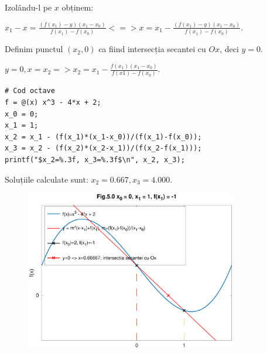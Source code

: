 \documentclass[12pt]{article}
\begin{document}
Izolându-l pe $x$ obținem:

$x_1-x = \frac{(f(x_1)-y)(x_1-x_0)}{f(x_1)-f(x_0)} <=>
x = x_1-\frac{(f(x_1)-y)(x_1-x_0)}{f(x_1)-f(x_0)}$.

Definim punctul $(x_2,0)$ ca fiind intersecția secantei cu $Ox$, deci $y=0$.

$y=0, x=x_2 => x_2 = x_1-\frac{f(x_1)(x_1-x_0)}{f(x1)-f(x_0)}$.

\scriptsize
\begin{verbatim}
# Cod octave
f = @(x) x^3 - 4*x + 2;
x_0 = 0;
x_1 = 1;
x_2 = x_1 - (f(x_1)*(x_1-x_0))/(f(x_1)-f(x_0));
x_3 = x_2 - (f(x_2)*(x_2-x_1))/(f(x_2-f(x_1)));
printf("$x_2=%.3f, x_3=%.3f$\n", x_2, x_3);
\end{verbatim}
\normalsize

Soluțiile calculate sunt: $x_2=0.667, x_3=4.000$.

\begin{figure}[htbp]
    \begin{center}
        \includegraphics[height=70mm]{octave-fig/Fig.5.0.eps}
    \end{center}
\end{figure}
\end{document}
